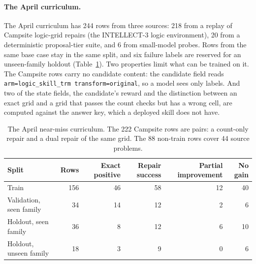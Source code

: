 \documentclass[11pt]{article}
\begin{document}
\paragraph{The April curriculum.} The April curriculum has 244 rows from three sources: 218 from a replay of Campsite logic-grid repairs (the INTELLECT-3 logic environment), 20 from a deterministic proposal-tier suite, and 6 from small-model probes. Rows from the same base case stay in the same split, and six failure labels are reserved for an unseen-family holdout (Table~\ref{tab:splits}). Two properties limit what can be trained on it. The Campsite rows carry no candidate content: the candidate field reads \texttt{arm=logic\_skill\_trm transform=original}, so a model sees only labels. And two of the state fields, the candidate's reward and the distinction between an exact grid and a grid that passes the count checks but has a wrong cell, are computed against the answer key, which a deployed skill does not have.

\begin{table}[t]
  \centering
  \small
  \begin{tabular}{lrrrrr}
    \toprule
    Split & Rows & Exact positive & Repair success & Partial improvement & No gain \\
    \midrule
    Train & 156 & 46 & 58 & 12 & 40 \\
    Validation, seen family & 34 & 14 & 12 & 2 & 6 \\
    Holdout, seen family & 36 & 8 & 12 & 6 & 10 \\
    Holdout, unseen family & 18 & 3 & 9 & 0 & 6 \\
    \bottomrule
  \end{tabular}
  \caption{The April near-miss curriculum. The 222 Campsite rows are pairs: a count-only repair and a dual repair of the same grid. The 88 non-train rows cover 44 source problems.}
  \label{tab:splits}
\end{table}
\end{document}

